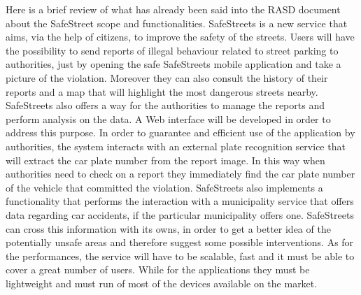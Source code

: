 Here is a brief review of what has already been said into the RASD document about the SafeStreet scope and functionalities.
\newline
SafeStreets is a new service that aims, via the help of citizens, to improve the safety of the streets. Users will have the possibility to send reports of illegal behaviour related to street parking to authorities, just by opening the safe SafeStreets mobile application and take a picture of the violation. Moreover they can also consult the history of their reports and a map that will highlight the most dangerous streets nearby. SafeStreets also offers a way for the authorities to manage the reports and perform analysis on the data. A Web interface will be developed in order to address this purpose. In order to guarantee and efficient use of the application by authorities, the system interacts with an external plate recognition service that will extract the car plate number from the report image. In this way when authorities need to check on a report they immediately find the car plate number of the vehicle that committed the violation. SafeStreets also implements a functionality that performs the interaction with a municipality service that offers data regarding car accidents, if the particular municipality offers one. SafeStreets can cross this information with its owns, in order to get a better idea of the potentially unsafe areas and therefore suggest some possible interventions.
As for the performances, the service will have to be scalable,
fast and it must be able to cover a great number of users. While for the applications they must be lightweight and must run of most of the devices available on the market.
